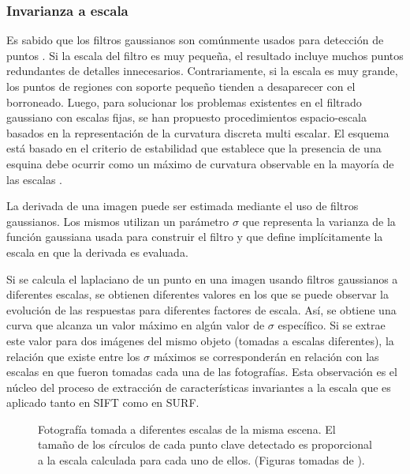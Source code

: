   \subsubsection{Invarianza a escala}%
      \label{sec:invarianza_a_escala}
      Es sabido que los filtros gaussianos son comúnmente usados para detección de puntos \cite{Bay:2008:SRF}. Si la escala del filtro es muy pequeña, el resultado incluye muchos puntos redundantes de detalles innecesarios. Contrariamente, si la escala es muy grande, los puntos de regiones con soporte pequeño tienden a desaparecer con el borroneado. Luego, para solucionar los problemas existentes en el filtrado gaussiano con escalas fijas, se han propuesto procedimientos espacio-escala basados en la representación de la curvatura discreta multi escalar. El esquema está basado en el criterio de estabilidad que establece que la presencia de una esquina debe ocurrir como un máximo de curvatura observable en la mayoría de las escalas \cite{springerlink:10.1023/A:1008045108935}.

      La derivada de una imagen puede ser estimada mediante el uso de filtros gaussianos. Los mismos utilizan un parámetro $\sigma$ que representa la varianza de la función gaussiana usada para construir el filtro y que define implícitamente la escala en que la derivada es evaluada.

      Si se calcula el laplaciano de un punto en una imagen usando filtros gaussianos a diferentes escalas, se obtienen diferentes valores en los que se puede observar la evolución de las respuestas para diferentes factores de escala. Así, se  obtiene una curva que alcanza un valor máximo en algún valor de $\sigma$ específico. Si se extrae este valor para dos imágenes del mismo objeto (tomadas a escalas diferentes), la relación que existe entre los $\sigma$ máximos se corresponderán en relación con las escalas en que fueron tomadas cada una de las fotografías. Esta observación es el núcleo del proceso de extracción de características invariantes a la escala que es aplicado tanto en SIFT como en SURF. %
  \begin{figure}[tbhp]
	\centering
	\hspace{0.1\linewidth}
	  \caption[Fotografía tomada a diferentes escalas para la misma escena]{Fotografía tomada a diferentes escalas de la misma escena. El tamaño de los círculos de cada punto clave detectado es proporcional a la escala calculada para cada uno de ellos. (Figuras tomadas de \cite{citeulike:9456628}).}
	\label{fig:church_difference_surf}                %
      \end{figure}
